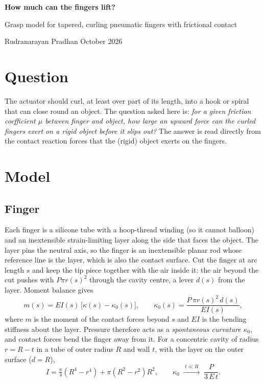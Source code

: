 \documentclass[11pt,a4paper]{article}
\numberwithin{equation}{section}
\begin{document}
\begin{center}
{\LARGE\bfseries How much can the fingers lift?\par}
\vspace{4pt}
{\large Grasp model for tapered, curling pneumatic fingers with frictional contact\par}
\vspace{6pt}
{\small Rudranarayan Pradhan \quad\textperiodcentered\quad October 2026}
\end{center}

\section{Question}
The actuator should curl, at least over part of its length, into a hook or spiral that can close round an
object. The question asked here is: \emph{for a given friction coefficient $\mu$ between finger and object,
how large an upward force can the curled fingers exert on a rigid object before it slips out?}
The answer is read directly from the contact reaction forces that the (rigid) object exerts on the fingers.

\section{Model}

\subsection{Finger}
Each finger is a silicone tube with a hoop-thread winding (so it cannot balloon) and an inextensible
strain-limiting layer along the side that faces the object. The layer pins the neutral axis, so the finger is
an inextensible planar rod whose reference line is the layer, which is also the contact surface.
Cut the finger at arc length $s$ and keep the tip piece together with the air inside it: the air beyond the
cut pushes with $P\pi r(s)^2$ through the cavity centre, a lever $d(s)$ from the layer. Moment balance gives
\begin{equation}
m(s) = EI(s)\,\big[\kappa(s)-\kappa_0(s)\big],\qquad
\kappa_0(s) = \frac{P\,\pi r(s)^2\,d(s)}{EI(s)},
\label{eq:kappa0}
\end{equation}
where $m$ is the moment of the contact forces beyond $s$ and $EI$ is the bending stiffness about the layer.
Pressure therefore acts as a \emph{spontaneous curvature} $\kappa_0$, and contact forces bend the finger
away from it. For a concentric cavity of radius $r=R-t$ in a tube of outer radius $R$ and wall $t$, with the
layer on the outer surface ($d=R$),
\begin{equation}
I = \tfrac{\pi}{4}(R^4-r^4) + \pi(R^2-r^2)R^2,\qquad
\kappa_0 \;\xrightarrow{\;t\ll R\;}\; \frac{P}{3\,E\,t}.
\label{eq:thin}
\end{equation}
\end{document}
